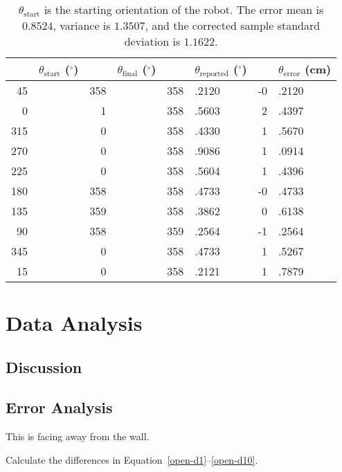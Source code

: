 \documentclass[twocolumn]{article}
\def\degree{\ensuremath{^\circ}}
\begin{document}
\begin{table*}[htb]
\begin{center}\begin{tabular}{r@{}l r@{}l r@{}l r@{}l}
&$\theta_{\text{start}}$ (\degree)& &$\theta_{\text{final}}$ (\degree)& &$\theta_{\text{reported}}$ (\degree)& &$\theta_{\text{error}}$ (cm) \\
\hline
45&& 358&& 358&.2120& -0&.2120 \\
0&& 1&& 358&.5603& 2&.4397 \\
315&& 0&& 358&.4330& 1&.5670 \\
270&& 0&& 358&.9086& 1&.0914 \\
225&& 0&& 358&.5604& 1&.4396 \\
180&& 358&& 358&.4733& -0&.4733 \\
135&& 359&& 358&.3862& 0&.6138 \\
90&& 358&& 359&.2564& -1&.2564 \\
345&& 0&& 358&.4733& 1&.5267 \\
15&& 0&& 358&.2121& 1&.7879 \\
\end{tabular}\end{center}
\caption{$\theta_{\text{start}}$ is the starting orientation of the robot.
The error mean is $0.8524$, variance is $1.3507$, and the corrected sample standard deviation is $1.1622$.}
\label{wall}
\end{table*}



\cite{alexneil3}

\section{Data Analysis}

\subsection{Discussion}

\subsection{Error Analysis}

This is facing away from the wall.

Calculate the differences in Equation~\ref{open-d1}--\ref{open-d10}.
\end{document}
